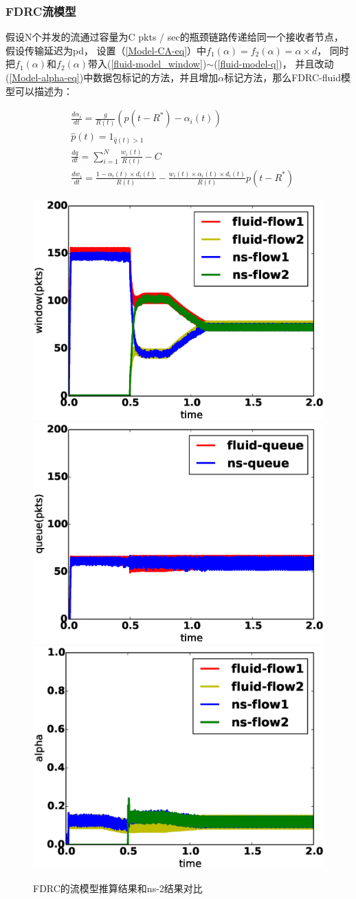 \subsubsection{FDRC流模型}
假设N个并发的流通过容量为C pkts / sec的瓶颈链路传递给同一个接收者节点，假设传输延迟为pd，
设置（\ref{Model-CA-eq}）中$f_1(\alpha)=f_2(\alpha)=\alpha \times d$，
同时把$f_1(\alpha)$和$f_2(\alpha)$带入(\ref{fluid-model_window})$\sim$(\ref{fluid-model-q})，
并且改动(\ref{Model-alpha-eq})中数据包标记的方法，并且增加$\alpha$标记方法，那么FDRC-fluid模型可以描述为：

\begin{align}
&\frac{d\alpha_i}{dt}=\frac{g}{R(t)}(p(t-R^*)-\alpha_i(t)) \label{FDRC-model_alpha} \\
&\widehat{p}(t)=1_{\widehat{q}(t)>1}  \label{FDRC-model_mark} \\
&\frac{dq}{dt}= \sum_{i=1}^N{\frac{w_i(t)}{R(t)}}-C \label{FDRC-model_queue}  \\
&\frac{dw_i}{dt}=\frac{1-\alpha_i(t)\times d_{i}(t)}{R(t)}-\frac{w_i(t) \times \alpha_i(t)\times d_i(t)}{R(t)}p(t-R^*)  \label{FDRC-model_window}
\end{align}

\begin{figure}[h]
\centering
{}
 {\includegraphics[width=0.32\columnwidth]{figures/FDRC/model/window.eps}}
{\includegraphics[width=0.32\columnwidth]{figures/FDRC/model/queue.eps}}
\subcaptionbox{$\alpha$}
{\includegraphics[width=0.32\columnwidth]{figures/FDRC/model/alpha.eps}}
\caption{FDRC的流模型推算结果和ns-2结果对比}
\label{fdrc-fluid-model-fig}
\end{figure}

